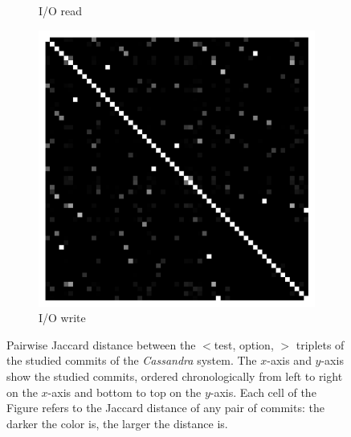 \begin{figure}[t]
\begin{subfigure}{0.19\textwidth}
                \caption{I/O read}
        \end{subfigure}
        \begin{subfigure}{0.19\textwidth}
                \includegraphics[width=\linewidth]{Figures/cassandra-iowrite-commitX.pdf}
                \caption{I/O write}
        \end{subfigure}
        
	\caption{Pairwise Jaccard distance between the $<$test, option, \inconsistent$>$ triplets of the studied commits of the \emph{Cassandra} system. The $x$-axis and $y$-axis show the studied commits, ordered chronologically from left to right on the $x$-axis and bottom to top on the $y$-axis. Each cell of the Figure refers to the Jaccard distance of any pair of commits: the darker the color is, the larger the distance is.}
	\label{fig:across-commit-cassandra}
\end{figure}



